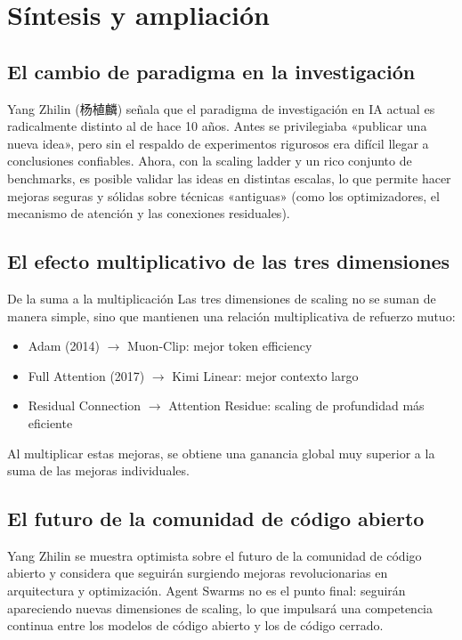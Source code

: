 \section{Síntesis y ampliación}

\subsection{El cambio de paradigma en la investigación}

Yang Zhilin (杨植麟) señala que el paradigma de investigación en IA actual es radicalmente distinto al de hace 10 años. Antes se privilegiaba «publicar una nueva idea», pero sin el respaldo de experimentos rigurosos era difícil llegar a conclusiones confiables. Ahora, con la scaling ladder y un rico conjunto de benchmarks, es posible validar las ideas en distintas escalas, lo que permite hacer mejoras seguras y sólidas sobre técnicas «antiguas» (como los optimizadores, el mecanismo de atención y las conexiones residuales).

\subsection{El efecto multiplicativo de las tres dimensiones}

\begin{importantbox}{De la suma a la multiplicación}
Las tres dimensiones de scaling no se suman de manera simple, sino que mantienen una relación multiplicativa de refuerzo mutuo:
\begin{itemize}
    \item Adam (2014) $\rightarrow$ Muon-Clip: mejor token efficiency
    \item Full Attention (2017) $\rightarrow$ Kimi Linear: mejor contexto largo
    \item Residual Connection $\rightarrow$ Attention Residue: scaling de profundidad más eficiente
\end{itemize}
Al multiplicar estas mejoras, se obtiene una ganancia global muy superior a la suma de las mejoras individuales.
\end{importantbox}

\subsection{El futuro de la comunidad de código abierto}

Yang Zhilin se muestra optimista sobre el futuro de la comunidad de código abierto y considera que seguirán surgiendo mejoras revolucionarias en arquitectura y optimización. Agent Swarms no es el punto final: seguirán apareciendo nuevas dimensiones de scaling, lo que impulsará una competencia continua entre los modelos de código abierto y los de código cerrado.

